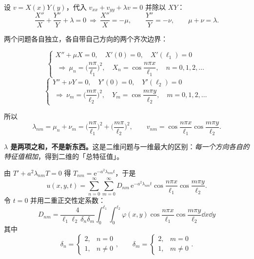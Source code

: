 
设 $v=X(x)Y(y)$，代入 $v_{xx}+v_{yy}+\lambda v=0$ 并除以 $XY$：
\begin{equation}
  \frac{X''}{X}+\frac{Y''}{Y}+\lambda=0
  \ \Longrightarrow\
  \frac{X''}{X}=-\mu,\qquad \frac{Y''}{Y}=-\nu,\qquad \mu+\nu=\lambda .
\end{equation}

两个问题各自独立，各自带自己方向的两个齐次边界：

\begin{equation}
  \begin{cases}
    X''+\mu X=0,\quad X'(0)=0,\quad X'(\ell_1)=0\\
    \ \Longrightarrow\ \mu_n=\Big(\dfrac{n\pi}{\ell_1}\Big)^2,\quad X_n=\cos\dfrac{n\pi x}{\ell_1},\quad n=0,1,2,\dots
  \end{cases}
\end{equation}
\begin{equation}
  \begin{cases}
    Y''+\nu Y=0,\quad Y'(0)=0,\quad Y'(\ell_2)=0\\
    \ \Longrightarrow\ \nu_m=\Big(\dfrac{m\pi}{\ell_2}\Big)^2,\quad Y_m=\cos\dfrac{m\pi y}{\ell_2},\quad m=0,1,2,\dots
  \end{cases}
\end{equation}

所以
\begin{equation}
  \lambda_{nm}=\mu_n+\nu_m=\Big(\frac{n\pi}{\ell_1}\Big)^2+\Big(\frac{m\pi}{\ell_2}\Big)^2,
  \qquad
  v_{nm}=\cos\frac{n\pi x}{\ell_1}\cos\frac{m\pi y}{\ell_2}.
\end{equation}

\textbf{$\lambda$ 是两项之和，不是新东西。}这是二维问题与一维最大的区别：\emph{每一个方向各自的特征值相加}，得到二维的「总特征值」。


由 $T'+a^2\lambda_{nm}T=0$ 得 $T_{nm}=\mathrm e^{-a^2\lambda_{nm}t}$，于是
\begin{equation}
  u(x,y,t)=\sum_{n=0}^{\infty}\sum_{m=0}^{\infty}D_{nm}\,
  \mathrm e^{-a^2\lambda_{nm}t}\cos\frac{n\pi x}{\ell_1}\cos\frac{m\pi y}{\ell_2}.
\end{equation}
令 $t=0$ 并用二重正交性定系数：
\begin{equation}
  \boxed{\;
  D_{nm}=\frac{4}{\ell_1\ell_2\,\delta_n\delta_m}
  \int_0^{\ell_1}\!\!\int_0^{\ell_2}\varphi(x,y)
  \cos\frac{n\pi x}{\ell_1}\cos\frac{m\pi y}{\ell_2}\dd x\dd y\;}
\end{equation}
其中
\begin{equation}
  \delta_n=\begin{cases}2,& n=0\\ 1,& n\ne0\end{cases},\qquad
  \delta_m=\begin{cases}2,& m=0\\ 1,& m\ne0\end{cases}.
\end{equation}

